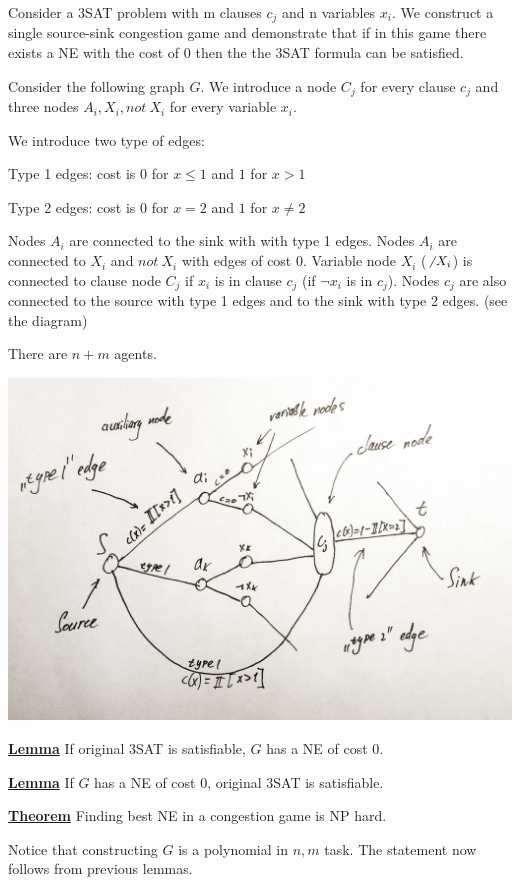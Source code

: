 Consider a 3SAT problem with m clauses $c_j$ and n variables $x_i$. We construct a single source-sink congestion game and demonstrate that if in this game there exists a NE with the cost of 0 then the the 3SAT formula can be satisfied.

Consider the following graph $G$. We introduce a node $C_j$ for every clause $c_j$ and three nodes $A_i,X_i,not\ X_i$ for every variable $x_i$.

We introduce two type of edges:

Type 1 edges: cost is 0 for $x\leq1$ and $1$ for $x>1$

Type 2 edges: cost is 0 for $x=2$ and $1$ for $x\neq 2$

Nodes $A_i$ are connected to the sink with with type 1 edges. Nodes $A_i$ are connected to $X_i$ and $not\ X_i$ with edges of cost 0. Variable node $X_i$ ($\not\ X_i$) is connected to clause node $C_j$ if $x_i$ is in clause $c_j$ (if $\neg x_i$ is in $c_j$). Nodes $c_j$ are also connected to the source with type 1 edges and to the sink with type 2 edges. (see the diagram)

There are $n+m$ agents.

\includegraphics[scale=0.5]{1.jpg}

\uline{\textbf{Lemma}} If original 3SAT is satisfiable, $G$ has a NE of cost 0.

\uline{\textbf{Lemma}} If  $G$ has a NE of cost 0, original 3SAT is satisfiable.

\uline{\textbf{Theorem}} Finding best NE in a congestion game is NP hard.


 Notice that constructing $G$ is a polynomial in $n,m$ task. The statement now follows from previous lemmas.

